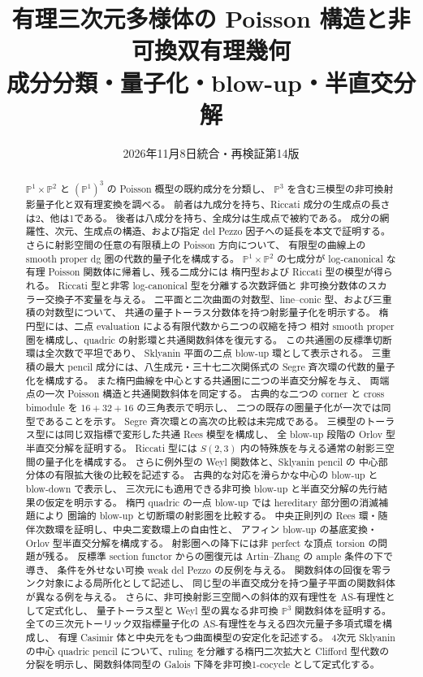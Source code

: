 \documentclass[11pt,a4paper]{ltjsarticle}
\title{有理三次元多様体の Poisson 構造と非可換双有理幾何\\\large 成分分類・量子化・blow-up・半直交分解}
\author{}
\date{2026年11月8日\quad 統合・再検証第14版}
\theoremstyle{definition}
\newcommand{\PP}{\mathbb P}
\begin{document}
\maketitle
\begin{abstract}
$\PP^1\times\PP^2$ と $(\PP^1)^3$ の Poisson 概型の既約成分を分類し、
$\PP^3$ を含む三模型の非可換射影量子化と双有理変換を調べる。
前者は九成分を持ち、Riccati 成分の生成点の長さは2、他は1である。
後者は八成分を持ち、全成分は生成点で被約である。
成分の網羅性、次元、生成点の構造、および指定 del Pezzo 因子への延長を本文で証明する。
さらに射影空間の任意の有限積上の Poisson 方向について、
有限型の曲線上の smooth proper dg 圏の代数的量子化を構成する。
$\PP^1\times\PP^2$ の七成分が
log-canonical な有理 Poisson 関数体に帰着し、残る二成分には
楕円型および Riccati 型の模型が得られる。
Riccati 型と非零 log-canonical 型を分離する次数評価と
非可換分数体のスカラー交換子不変量を与える。
二平面と二次曲面の対数型、line--conic 型、および三重積の対数型について、
共通の量子トーラス分数体を持つ射影量子化を明示する。
楕円型には、二点 evaluation による有限代数から二つの収縮を持つ
相対 smooth proper 圏を構成し、quadric の射影環と共通関数斜体を復元する。
この共通圏の反標準切断環は全次数で平坦であり、
Sklyanin 平面の二点 blow-up 環として表示される。
三重積の最大 pencil 成分には、八生成元・三十七二次関係式の
Segre 斉次環の代数的量子化を構成する。
また楕円曲線を中心とする共通圏に二つの半直交分解を与え、
両端点の一次 Poisson 構造と共通関数斜体を同定する。
古典的な二つの corner と cross bimodule を $16+32+16$ の三角表示で明示し、
二つの既存の圏量子化が一次では同型であることを示す。
Segre 斉次環との高次の比較は未完成である。
三模型のトーラス型には同じ双指標で変形した共通 Rees 模型を構成し、
全 blow-up 段階の Orlov 型半直交分解を証明する。
Riccati 型には $S(2,3)$ 内の特殊族を与える通常の射影三空間の量子化を構成する。
さらに例外型の Weyl 関数体と、Sklyanin pencil の
中心部分体の有限拡大後の比較を記述する。
古典的な対応を滑らかな中心の blow-up と blow-down で表示し、
三次元にも適用できる非可換 blow-up と半直交分解の先行結果の仮定を明示する。
楕円 quadric の一点 blow-up では hereditary 部分圏の消滅補題により
圏論的 blow-up と切断環の射影圏を比較する。
中央正則列の Rees 環・随伴次数環を証明し、中央二変数環上の自由性と、
アフィン blow-up の基底変換・Orlov 型半直交分解を構成する。
射影圏への降下には非 perfect な頂点 torsion の問題が残る。
反標準 section functor からの圏復元は Artin--Zhang の ample 条件の下で導き、
条件を外せない可換 weak del Pezzo の反例を与える。
関数斜体の回復を零ランク対象による局所化として記述し、
同じ型の半直交成分を持つ量子平面の関数斜体が異なる例を与える。
さらに、非可換射影三空間への斜体的双有理性を AS-有理性として定式化し、
量子トーラス型と Weyl 型の異なる非可換 $\PP^3$ 関数斜体を証明する。
全ての三次元トーリック双指標量子化の AS-有理性を与える四次元量子多項式環を構成し、
有理 Casimir 体と中央元をもつ曲面模型の安定化を記述する。
4次元 Sklyanin の中心 quadric pencil について、ruling を分離する楕円二次拡大と
Clifford 型代数の分裂を明示し、関数斜体同型の Galois 下降を非可換1-cocycle として定式化する。
\end{abstract}
\setcounter{tocdepth}{2}
\begingroup
\footnotesize
\makeatletter
\renewcommand{\@pnumwidth}{2em}
\makeatother
\tableofcontents
\endgroup
\clearpage
\end{document}
